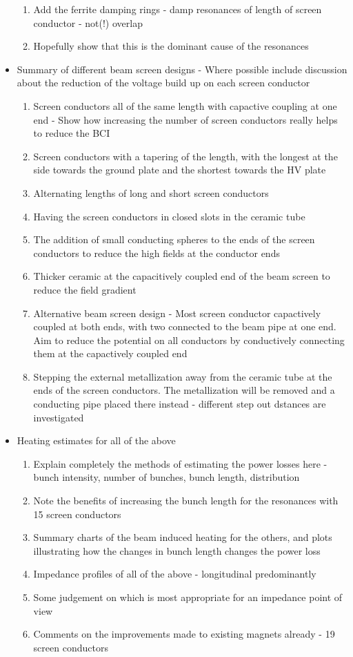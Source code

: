 \begin{itemize}
\begin{enumerate}
\item{Add the ferrite damping rings - damp resonances of length of screen conductor - not(!) overlap}
\item{Hopefully show that this is the dominant cause of the resonances}
\end{enumerate}
\item{Summary of different beam screen designs - Where possible include discussion about the reduction of the voltage build up on each screen conductor}
\begin{enumerate}
\item{Screen conductors all of the same length with capactive coupling at one end - Show how increasing the number of screen conductors really helps to reduce the BCI}
\item{Screen conductors with a tapering of the length, with the longest at the side towards the ground plate and the shortest towards the HV plate}
\item{Alternating lengths of long and short screen conductors}
\item{Having the screen conductors in closed slots in the ceramic tube}
\item{The addition of small conducting spheres to the ends of the screen conductors to reduce the high fields at the conductor ends}
\item{Thicker ceramic at the capacitively coupled end of the beam screen to reduce the field gradient}
\item{Alternative beam screen design - Most screen conductor capactively coupled at both ends, with two connected to the beam pipe at one end. Aim to reduce the potential on all conductors by conductively connecting them at the capactively coupled end}
\item{Stepping the external metallization away from the ceramic tube at the ends of the screen conductors. The metallization will be removed and a conducting pipe placed there instead - different step out dstances are investigated}
\end{enumerate}

\item{Heating estimates for all of the above}
\begin{enumerate}
\item{Explain completely the methods of estimating the power losses here - bunch intensity, number of bunches, bunch length, distribution}
\item{Note the benefits of increasing the bunch length for the resonances with 15 screen conductors}
\item{Summary charts of the beam induced heating for the others, and plots illustrating how the changes in bunch length changes the power loss}
\item{Impedance profiles of all of the above - longitudinal predominantly}
\item{Some judgement on which is most appropriate for an impedance point of view}
\item{Comments on the improvements made to existing magnets already - 19 screen conductors}
\end{enumerate}
\end{itemize}
